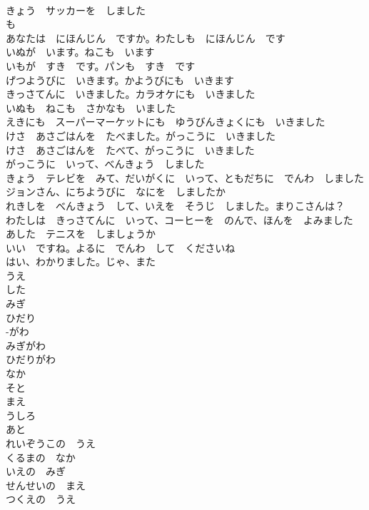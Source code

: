 \documentclass[8pt]{extreport}
\begin{document}
\begin{CJK}{UTF8}{min}
\\	きょう　サッカーを　しました	
\\	も	
\\	あなたは　にほんじん　ですか。わたしも　にほんじん　です	
\\	いぬが　います。ねこも　います	
\\	いもが　すき　です。パンも　すき　です	
\\	げつようびに　いきます。かようびにも　いきます	
\\	きっさてんに　いきました。カラオケにも　いきました	
\\	いぬも　ねこも　さかなも　いました	
\\	えきにも　スーパーマーケットにも　ゆうびんきょくにも　いきました	
\\	けさ　あさごはんを　たべました。がっこうに　いきました	
\\	けさ　あさごはんを　たべて、がっこうに　いきました	
\\	がっこうに　いって、べんきょう　しました	
\\	きょう　テレビを　みて、だいがくに　いって、ともだちに　でんわ　しました	
\\	ジョンさん、にちようびに　なにを　しましたか	
\\	れきしを　べんきょう　して、いえを　そうじ　しました。まりこさんは？	
\\	わたしは　きっさてんに　いって、コーヒーを　のんで、ほんを　よみました	
\\	あした　テニスを　しましょうか	
\\	いい　ですね。よるに　でんわ　して　くださいね	
\\	はい、わかりました。じゃ、また	
\\	うえ	
\\	した 
\\	みぎ	
\\	ひだり	
\\	-がわ	
\\	みぎがわ	
\\	ひだりがわ	
\\	なか	
\\	そと	
\\	まえ	
\\	うしろ	
\\	あと	
\\	れいぞうこの　うえ	
\\	くるまの　なか	
\\	いえの　みぎ	
\\	せんせいの　まえ	
\\	つくえの　うえ	

\end{CJK}
\end{document}
